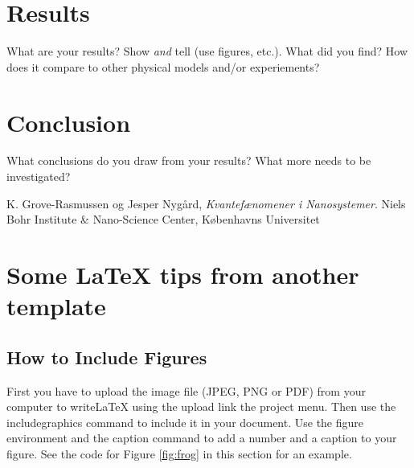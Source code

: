 \documentclass[]{article}%
\begin{document}
\section{Results}
\label{sec:results}

What are your results? Show \textit{and} tell (use figures, etc.). What did you find? How does it compare to other physical models and/or experiements?

\section{Conclusion}
\label{sec:conclusion}

What conclusions do you draw from your results? What more needs to be investigated?

\begin{thebibliography}{9}
  K. Grove-Rasmussen og Jesper Nygård,
  \emph{Kvantefænomener i Nanosystemer}.
  Niels Bohr Institute \& Nano-Science Center, Københavns Universitet

\end{thebibliography}






\newpage
\appendix
\section{Some LaTeX tips from another template}
\label{sec:latex}
\subsection{How to Include Figures}

First you have to upload the image file (JPEG, PNG or PDF) from your computer to writeLaTeX using the upload link the project menu. Then use the includegraphics command to include it in your document. Use the figure environment and the caption command to add a number and a caption to your figure. See the code for Figure \ref{fig:frog} in this section for an example.
\end{document}
